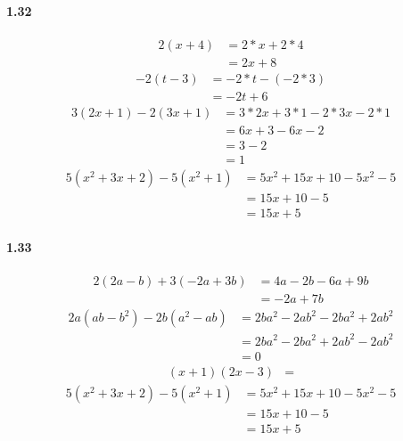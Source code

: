 \documentclass{article}
\begin{document}
\paragraph{1.32}
\begin{align*}
  2(x + 4) &= 2*x + 2 * 4 \\
  &= 2x + 8
\end{align*}
\begin{align*}
  -2(t - 3) &= -2 * t - (-2 * 3) \\
  &= -2t + 6
\end{align*}
\begin{align*}
  3(2x + 1 ) - 2(3x + 1) &= 3 * 2x + 3 * 1 - 2 * 3x - 2 * 1 \\
  &= 6x + 3 - 6x - 2 \\
  &= 3 - 2 \\ 
  &= 1
\end{align*}
\begin{align*}
  5(x^2 + 3x + 2) - 5(x^2 + 1) &= 5x^2 + 15x + 10 - 5x^2 - 5 \\
  &= 15x + 10 - 5 \\
  &= 15x + 5
\end{align*}

\paragraph{1.33}
\begin{align*}
  2(2a - b) + 3(-2a + 3b) &= 4a - 2b - 6a + 9b \\
  &= -2a + 7b
\end{align*}
\begin{align*}
  2a(ab - b^2) - 2b(a^2 - ab) &= 2ba^2 - 2ab^2 - 2ba^2 + 2ab^2 \\
  &= 2ba^2 - 2ba^2 + 2ab^2 - 2ab^2 \\
  &= 0
\end{align*}
\begin{align*}
  (x + 1)(2x - 3) &= 
\end{align*}
\begin{align*}
  5(x^2 + 3x + 2) - 5(x^2 + 1) &= 5x^2 + 15x + 10 - 5x^2 - 5 \\
  &= 15x + 10 - 5 \\
  &= 15x + 5
\end{align*}
\end{document}
